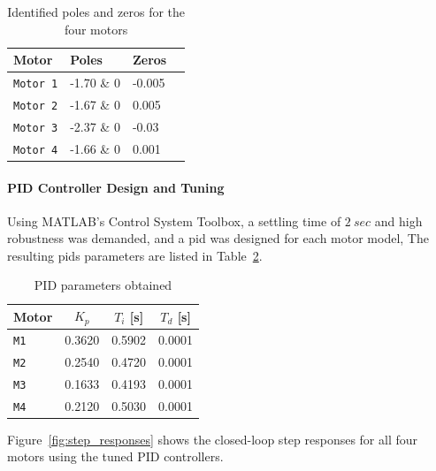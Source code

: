 \begin{table}[H]
  \centering
  \begin{tabular}{@{}llll@{}}
    \toprule
    \textbf{Motor}   & \textbf{Poles} & \textbf{Zeros} \\
    \midrule
    \texttt{Motor 1} & -1.70 \& 0     & -0.005         \\
    \texttt{Motor 2} & -1.67 \& 0     & 0.005          \\
    \texttt{Motor 3} & -2.37 \& 0     & -0.03          \\
    \texttt{Motor 4} & -1.66 \& 0     & 0.001          \\
    \bottomrule
  \end{tabular}
  \caption{Identified poles and zeros for the four motors}
  \label{tab:identification}
\end{table}

\paragraph*{PID Controller Design and Tuning}
Using MATLAB's Control System Toolbox, a settling time of $2~sec$ and high robustness was demanded, and a \gls{pid} was designed for each motor model,
The resulting \glspl{pid} parameters are listed in Table~\ref{tab:pid_constants}.

\begin{table}[H]
  \centering
  \begin{tabular}{@{}lccc@{}}
    \toprule
    \textbf{Motor} & $K_p$  & $T_i$ [s] & $T_d$ [s] \\
    \midrule
    \texttt{M1}    & 0.3620 & 0.5902    & 0.0001    \\
    \texttt{M2}    & 0.2540 & 0.4720    & 0.0001    \\
    \texttt{M3}    & 0.1633 & 0.4193    & 0.0001    \\
    \texttt{M4}    & 0.2120 & 0.5030    & 0.0001    \\
    \bottomrule
  \end{tabular}
  \caption{PID parameters obtained}
  \label{tab:pid_constants}
\end{table}


Figure~\ref{fig:step_responses} shows the closed-loop step responses for all four motors using the tuned PID controllers.

